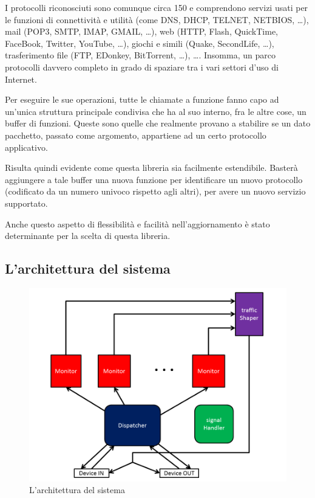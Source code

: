 I protocolli riconosciuti sono comunque circa 150 e comprendono servizi usati per le funzioni di connettività e utilità (come DNS, DHCP, TELNET, NETBIOS, \dots), mail (POP3, SMTP, IMAP, GMAIL, \dots), web (HTTP, Flash, QuickTime, FaceBook, Twitter, YouTube, \dots), giochi e simili (Quake, SecondLife, \dots), trasferimento file (FTP, EDonkey, BitTorrent, \dots), \dots . Insomma, un parco protocolli davvero completo in grado di spaziare tra i vari settori d'uso di Internet.

Per eseguire le sue operazioni, tutte le chiamate a funzione fanno capo ad un'unica struttura principale condivisa che ha al suo interno, fra le altre cose, un buffer di funzioni. Queste sono quelle che realmente provano a stabilire se un dato pacchetto, passato come argomento, appartiene ad un certo protocollo applicativo.

Risulta quindi evidente come questa libreria sia facilmente estendibile. Basterà aggiungere a tale buffer una nuova funzione per identificare un nuovo protocollo (codificato da un numero univoco rispetto agli altri), per avere un nuovo servizio supportato.

Anche questo aspetto di flessibilità e facilità nell'aggiornamento è stato determinante per la scelta di questa libreria.

\subsection{L'architettura del sistema}

\begin{figure}[htbp]
\begin{center}
\includegraphics[scale=0.5]{img/arch.png}
\caption{L'architettura del sistema}\label{arch}
\end{center}
\end{figure}

